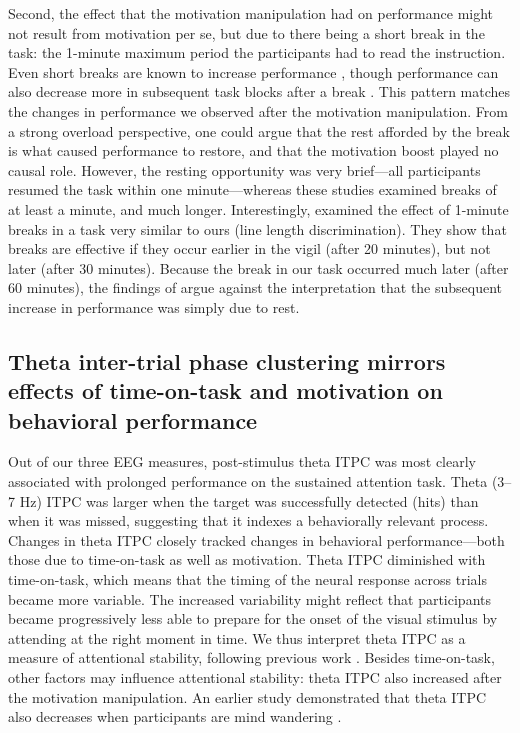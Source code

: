 \documentclass[11pt,english,]{memoir}
\begin{document}
Second, the effect that the motivation manipulation had on performance might not result from motivation per se, but due to there being a short break in the task: the 1-minute maximum period the participants had to read the instruction. Even short breaks are known to increase performance \autocite{Helton2015}, though performance can also decrease more in subsequent task blocks after a break \autocite{Lim2015}. This pattern matches the changes in performance we observed after the motivation manipulation. From a strong overload perspective, one could argue that the rest afforded by the break is what caused performance to restore, and that the motivation boost played no causal role. However, the resting opportunity was very brief---all participants resumed the task within one minute---whereas these studies examined breaks of at least a minute, and much longer. Interestingly, \textcite{Ross2014} examined the effect of 1-minute breaks in a task very similar to ours (line length discrimination). They show that breaks are effective if they occur earlier in the vigil (after 20 minutes), but not later (after 30 minutes). Because the break in our task occurred much later (after 60 minutes), the findings of \textcite{Ross2014} argue against the interpretation that the subsequent increase in performance was simply due to rest.

\hypertarget{theta-inter-trial-phase-clustering-mirrors-effects-of-time-on-task-and-motivation-on-behavioral-performance}{%
\subsection{Theta inter-trial phase clustering mirrors effects of time-on-task and motivation on behavioral performance}\label{theta-inter-trial-phase-clustering-mirrors-effects-of-time-on-task-and-motivation-on-behavioral-performance}}

Out of our three EEG measures, post-stimulus theta ITPC was most clearly associated with prolonged performance on the sustained attention task. Theta (3--7 Hz) ITPC was larger when the target was successfully detected (hits) than when it was missed, suggesting that it indexes a behaviorally relevant process. Changes in theta ITPC closely tracked changes in behavioral performance---both those due to time-on-task as well as motivation. Theta ITPC diminished with time-on-task, which means that the timing of the neural response across trials became more variable. The increased variability might reflect that participants became progressively less able to prepare for the onset of the visual stimulus by attending at the right moment in time. We thus interpret theta ITPC as a measure of attentional stability, following previous work \autocites{Lutz2009}{Slagter2009}. Besides time-on-task, other factors may influence attentional stability: theta ITPC also increased after the motivation manipulation. An earlier study demonstrated that theta ITPC also decreases when participants are mind wandering \autocite{Baird2014}.
\end{document}
